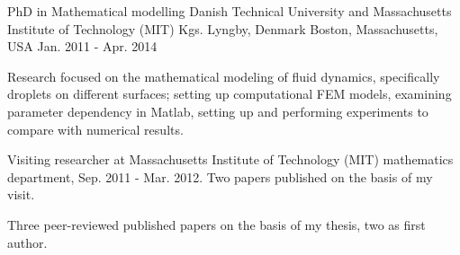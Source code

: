 \begin{cventries}
\cventry
{PhD in Mathematical modelling} %
{Danish Technical University and Massachusetts Institute of Technology (MIT)} %
{Kgs. Lyngby, Denmark \newline Boston, Massachusetts, USA} %
{Jan. 2011 - Apr. 2014} %
{ %
\begin{cvitems}
\item {Research focused on the mathematical modeling of fluid dynamics, specifically droplets on different surfaces; setting up computational FEM models, examining parameter dependency in Matlab, setting up and performing experiments to compare with numerical results.}
\item Visiting researcher at Massachusetts Institute of Technology (MIT) mathematics department, Sep. 2011 - Mar. 2012. Two papers published on the basis of my visit.
\item Three peer-reviewed published papers on the basis of my thesis, two as first author.
\end{cvitems}
}
\end{cventries}
